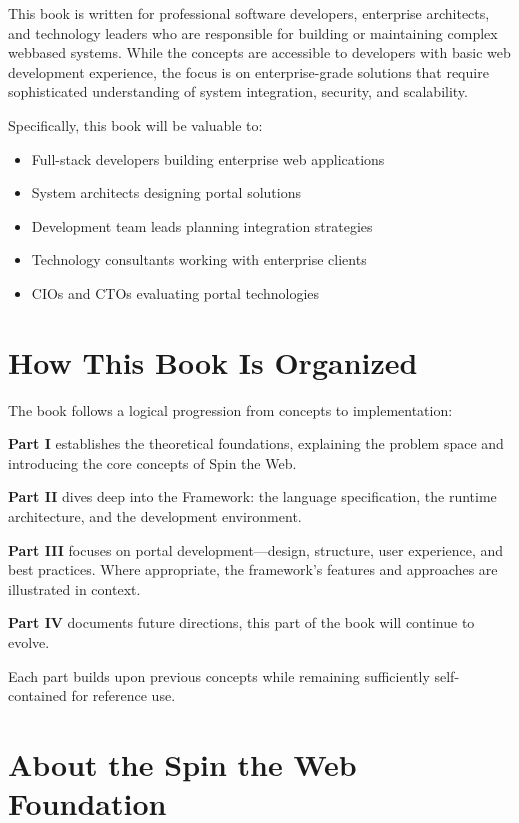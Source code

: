 This book is written for professional software developers, enterprise architects, and technology leaders who are responsible for building or maintaining complex webbased systems. While the concepts are accessible to developers with basic web development experience, the focus is on enterprise-grade solutions that require sophisticated understanding of system integration, security, and scalability.

Specifically, this book will be valuable to:
\begin{itemize}
\item Full-stack developers building enterprise web applications
\item System architects designing portal solutions
\item Development team leads planning integration strategies
\item Technology consultants working with enterprise clients
\item CIOs and CTOs evaluating portal technologies
\end{itemize}

\section*{How This Book Is Organized}

The book follows a logical progression from concepts to implementation:

\textbf{Part I} establishes the theoretical foundations, explaining the problem space and introducing the core concepts of Spin the Web.

\textbf{Part II} dives deep into the Framework: the \wbdl language specification, the \webspinner runtime architecture, and the \studio development environment.

\textbf{Part III} focuses on portal development—design, structure, user experience, and best practices. Where appropriate, the framework’s features and approaches are illustrated in context.

\textbf{Part IV} documents future directions, this part of the book will continue to evolve.

Each part builds upon previous concepts while remaining sufficiently self-contained for reference use.

\section*{About the Spin the Web Foundation}

